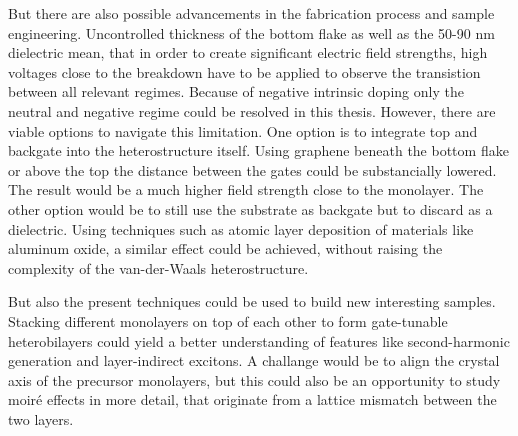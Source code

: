 But there are also possible advancements in the fabrication process and sample engineering. Uncontrolled thickness of the bottom \hbng flake as well as the 50-90 nm \sio dielectric mean, that in order to create significant electric field strengths, high voltages close to the breakdown have to be applied to observe the transistion between all relevant regimes. Because of negative intrinsic doping only the neutral and negative regime could be resolved in this thesis. However, there are viable options to navigate this limitation. One option is to integrate top and backgate into the heterostructure itself. Using graphene beneath the bottom \hbng flake or above the top the distance between the gates could be substancially lowered. The result would be a much higher field strength close to the monolayer. The other option would be to still use the substrate as backgate but to discard \sio as a dielectric. Using techniques such as atomic layer deposition of materials like aluminum oxide, a similar effect could be achieved, without raising the complexity of the van-der-Waals heterostructure.

But also the present techniques could be used to build new interesting samples. Stacking different \tmdg monolayers on top of each other to form gate-tunable heterobilayers could yield a better understanding of features like second-harmonic generation and layer-indirect excitons. A challange would be to align the crystal axis of the precursor monolayers, but this could also be an opportunity to study moiré effects in more detail, that originate from a lattice mismatch between the two layers.